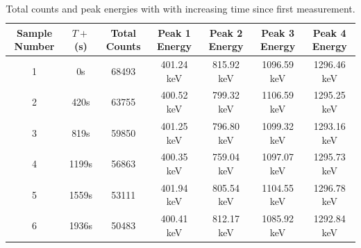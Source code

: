 \documentclass[a4paper,twocolumn]{IEEEtran}
\begin{document}
    \begin{table}[t]
        \centering
        \caption{Total counts and peak energies with with increasing time since first measurement.}
        \begin{tabular}{c c c c c c c}
            \toprule
            \textbf{Sample Number} & $T+$ \textbf{(s)} & \textbf{Total Counts} & \textbf{Peak 1 Energy} & \textbf{Peak 2 Energy} & \textbf{Peak 3 Energy} & \textbf{Peak 4 Energy} \\
            \midrule
            1 & 0s & 68493 & 401.24 keV &  815.92 keV & 1096.59 keV & 1296.46 keV \\
            2 & 420s & 63755 & 400.52 keV & 799.32 keV & 1106.59 keV & 1295.25 keV \\
            3 & 819s & 59850 & 401.25 keV & 796.80 keV & 1099.32 keV  & 1293.16 keV \\
            4 & 1199s & 56863 & 400.35 keV & 759.04 keV & 1097.07 keV & 1295.73 keV \\
            5 & 1559s & 53111 & 401.94 keV & 805.54 keV & 1104.55 keV & 1296.78 keV \\
            6 & 1936s & 50483 & 400.41 keV & 812.17 keV & 1085.92 keV & 1292.84 keV \\
            \bottomrule
        \end{tabular}
        \label{tab:counts_v_time}
    \end{table}
    \onecolumn
    \appendix
\end{document}
